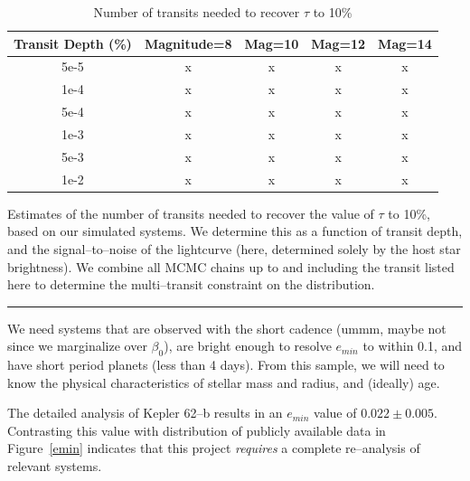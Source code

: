 \begin{table}[t]
\begin{center}
\caption{\label{tab-taurun} Number of transits needed to recover $\tau$ to 10\%}
\begin{tabular}{c|cccc}
\hline \hline
Transit Depth (\%) & Magnitude=8 & Mag=10 & Mag=12 & Mag=14\\
\hline
5e-5 & x & x & x & x \\
1e-4 & x & x & x & x \\
5e-4 & x & x & x & x \\
1e-3 & x & x & x & x \\
5e-3 & x & x & x & x \\
1e-2 & x & x & x & x \\
\hline
\end{tabular}
\end{center}
Estimates of the number of transits needed to recover the value of
$\tau$ to 10\%, based on our simulated systems.  We determine this as
a function of transit depth, and the signal--to--noise of the
lightcurve (here, determined solely by the host star brightness).  We
combine all MCMC chains up to and including the transit listed here to
determine the multi--transit constraint on the distribution.
\hspace*{\fill} \\
\hrule
\end{table}

\medskip
{\centerline{}}
\smallskip

We need systems that are observed with the short cadence (ummm, maybe
not since we marginalize over $\beta_0$), are bright enough to resolve
$e_{min}$ to within 0.1, and have short period planets (less than 4
days).  From this sample, we will need to know the physical
characteristics of stellar mass and radius, and (ideally) age.

The detailed \cite{2013arXiv1304.7387B} analysis of Kepler 62--b
results in an $e_{min}$ value of $0.022 \pm 0.005$.  Contrasting this
value with distribution of publicly available data in
Figure~\ref{emin} indicates that this project {\it requires} a
complete re--analysis of relevant systems.

\medskip
{\centerline{}}
\smallskip

